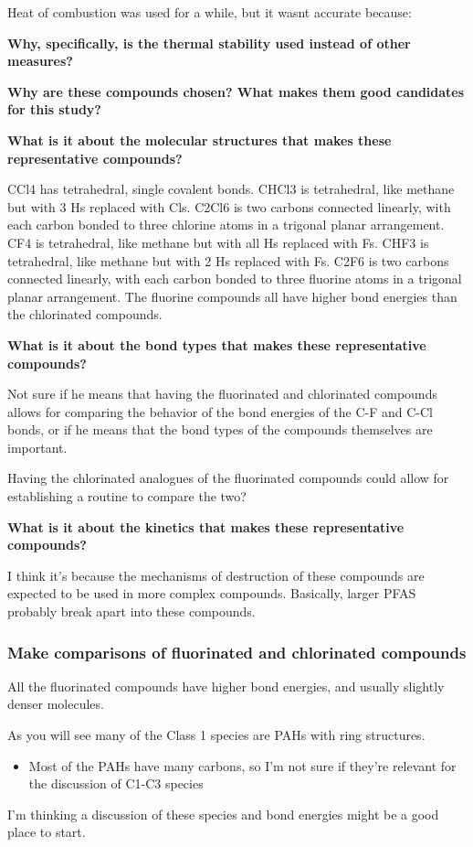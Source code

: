 \documentclass{article}
\begin{document}
Heat of combustion was used for a while, but it wasnt accurate because: 

\textbf{Why, specifically, is the thermal stability used instead of other measures?}

\textbf{Why are these compounds chosen? What makes them good candidates for this study?}

    \textbf{What is it about the molecular structures that makes these representative compounds?}

        CCl4 has tetrahedral, single covalent bonds. CHCl3 is tetrahedral, like methane but with 3 Hs replaced with Cls. C2Cl6 is two carbons connected linearly, with each carbon bonded to three chlorine atoms in a trigonal planar arrangement. CF4 is tetrahedral, like methane but with all Hs replaced with Fs. CHF3 is tetrahedral, like methane but with 2 Hs replaced with Fs. C2F6 is two carbons connected linearly, with each carbon bonded to three fluorine atoms in a trigonal planar arrangement. The fluorine compounds all have higher bond energies than the chlorinated compounds. 

    \textbf{What is it about the bond types that makes these representative compounds?}

        Not sure if he means that having the fluorinated and chlorinated compounds allows for comparing the behavior of the bond energies of the C-F and C-Cl bonds, or if he means that the bond types of the compounds themselves are important.

        Having the chlorinated analogues of the fluorinated compounds could allow for establishing a routine to compare the two?

    \textbf{What is it about the kinetics that makes these representative compounds?}

        I think it's because the mechanisms of destruction of these compounds are expected to be used in more complex compounds. Basically, larger PFAS probably break apart into these compounds.

\subsubsection*{Make comparisons of fluorinated and chlorinated compounds}

    All the fluorinated compounds have higher bond energies, and usually slightly denser molecules.

As you will see many of the Class 1 species are PAHs with ring structures.  
\begin{itemize}
    \item Most of the PAHs have many carbons, so I'm not sure if they're relevant for the discussion of C1-C3 species
\end{itemize}

I’m thinking a discussion of these species and bond energies might be a good place to start.
\end{document}

